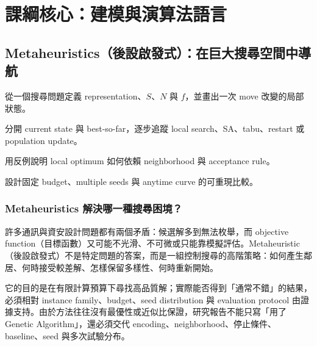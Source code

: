 \documentclass[11pt,a4paper,oneside,openany]{book}
\begin{document}
\tableofcontents
\listoffigures
\listoftables

\mainmatter
\part{課綱核心：建模與演算法語言}

\chapter{Metaheuristics（後設啟發式）：在巨大搜尋空間中導航}
\label{ch:meta}
\begin{chaptermastery}
\item 從一個搜尋問題定義 representation、$S$、$N$ 與 $f$，並畫出一次 move 改變的局部狀態。
\item 分開 current state 與 best-so-far，逐步追蹤 local search、SA、tabu、restart 或 population update。
\item 用反例說明 local optimum 如何依賴 neighborhood 與 acceptance rule。
\item 設計固定 budget、multiple seeds 與 anytime curve 的可重現比較。
\end{chaptermastery}

\section{Metaheuristics 解決哪一種搜尋困境？}
許多通訊與資安設計問題都有兩個矛盾：候選解多到無法枚舉，而 objective function（目標函數）又可能不光滑、不可微或只能靠模擬評估。Metaheuristic（後設啟發式）不是特定問題的答案，而是一組控制搜尋的高階策略：如何產生鄰居、何時接受較差解、怎樣保留多樣性、何時重新開始。

它的目的是在有限計算預算下尋找高品質解；實際能否得到「通常不錯」的結果，必須相對 instance family、budget、seed distribution 與 evaluation protocol 由證據支持。由於方法往往沒有最優性或近似比保證，研究報告不能只寫「用了 Genetic Algorithm」，還必須交代 encoding、neighborhood、停止條件、baseline、seed 與多次試驗分布。
\end{document}
